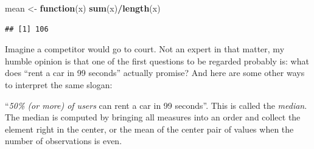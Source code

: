 \documentclass[]{svmono}
\newenvironment{Shaded}{\begin{snugshade}}{\end{snugshade}}
\newcommand{\KeywordTok}[1]{\textcolor[rgb]{0.13,0.29,0.53}{\textbf{#1}}}
\newcommand{\DataTypeTok}[1]{\textcolor[rgb]{0.13,0.29,0.53}{#1}}
\newcommand{\DecValTok}[1]{\textcolor[rgb]{0.00,0.00,0.81}{#1}}
\newcommand{\StringTok}[1]{\textcolor[rgb]{0.31,0.60,0.02}{#1}}
\newcommand{\ControlFlowTok}[1]{\textcolor[rgb]{0.13,0.29,0.53}{\textbf{#1}}}
\newcommand{\OperatorTok}[1]{\textcolor[rgb]{0.81,0.36,0.00}{\textbf{#1}}}
\newcommand{\NormalTok}[1]{#1}
\begin{document}
\begin{Shaded}
\begin{Highlighting}[]
\NormalTok{mean <-}\StringTok{ }\ControlFlowTok{function}\NormalTok{(x) }\KeywordTok{sum}\NormalTok{(x)}\OperatorTok{/}\KeywordTok{length}\NormalTok{(x)}
\end{Highlighting}
\end{Shaded}

\begin{Shaded}
\end{Shaded}

\begin{verbatim}
## [1] 106
\end{verbatim}

Imagine a competitor would go to court. Not an expert in that matter, my
humble opinion is that one of the first questions to be regarded
probably is: what does ``rent a car in 99 seconds'' actually promise?
And here are some other ways to interpret the same slogan:

``\emph{50\% (or more) of users} can rent a car in 99 seconds''. This is
called the \emph{median}. The median is computed by bringing all
measures into an order and collect the element right in the center, or
the mean of the center pair of values when the number of observations is
even.

\begin{Shaded}
\end{Shaded}
\end{document}
